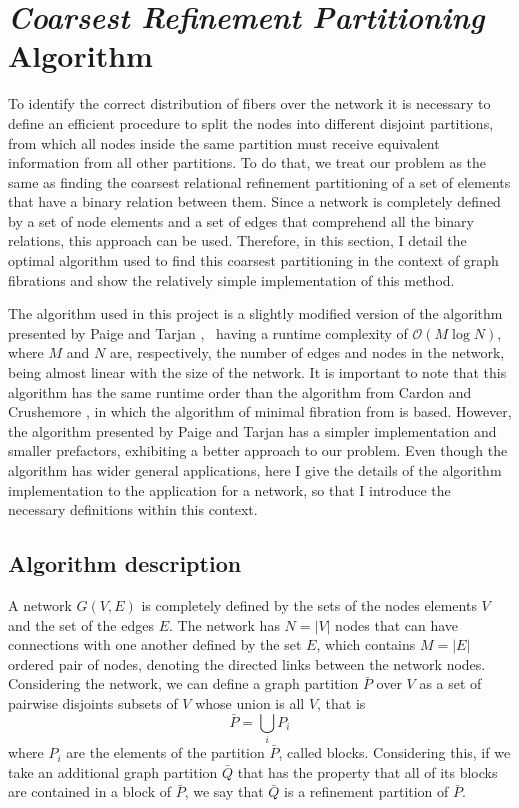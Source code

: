 \documentclass[12pt]{diazessay} %
\begin{document}

\section{\textit{Coarsest Refinement Partitioning }Algorithm}

To identify the correct distribution of fibers over the network it is necessary to define an efficient procedure to split the nodes into different disjoint partitions, from which all nodes inside the same partition must receive equivalent information from all other partitions. To do that, we treat our problem as the same as finding the coarsest relational refinement partitioning of a set of elements that have a binary relation between them. Since a network is completely defined by a set of node elements and a set of edges that comprehend all the binary relations, this approach can be used. Therefore, in this section, I detail the optimal algorithm used to find this coarsest partitioning in the context of graph fibrations and show the relatively simple implementation of this method.

The algorithm used in this project is a slightly modified version of the algorithm presented by Paige and Tarjan \cite{Tarjan1987}, \ having a runtime complexity of $\mathcal{O}(M\log N)$, where $M$ and $N$ are, respectively, the number of edges and nodes in the network, being almost linear with the size of the network. It is important to note that this algorithm has the same runtime order than the algorithm from Cardon and Crushemore \cite{Cardon1982}, in which the algorithm of minimal fibration from \cite{fibration2019} is based. However, the algorithm presented by Paige and Tarjan has a simpler implementation and smaller prefactors, exhibiting a better approach to our problem. Even though the algorithm has wider general applications, here I give the details of the algorithm implementation to the application for a network, so that I introduce the necessary definitions within this context.

\subsection{Algorithm description}

A network $G(V, E)$ is completely defined by the sets of the nodes elements $V$ and the set of the edges $E$. The network has $N = |V|$ nodes that can have connections with one another defined by the set $E$, which contains $M = |E|$ ordered pair of nodes, denoting the directed links between the network nodes. Considering the network, we can define a graph partition $\bar{P}$ over $V$ as a set of pairwise disjoints subsets of $V$ whose union is all $V$, that is
\begin{equation}
	\bar{P} = \bigcup_{i} P_i
\end{equation}
where $P_i$ are the elements of the partition $\bar{P}$, called blocks. Considering this, if we take an additional graph partition $\bar{Q}$ that has the property that all of its blocks are contained in a block of $\bar{P}$, we say that $\bar{Q}$ is a refinement partition of $\bar{P}$.
\end{document}

